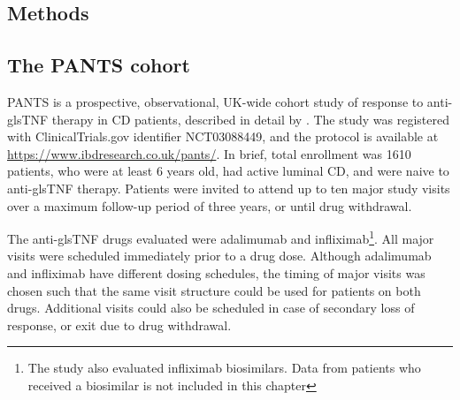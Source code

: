 \begin{outline}
\section{Methods}

\subsection{The PANTS cohort}

\gls{PANTS} is a prospective, observational, UK-wide cohort study of response to anti-gls{TNF} therapy in \gls{CD} patients, described in detail by \textcite{kennedy2019PredictorsAntiTNFTreatment}.
The study was registered with ClinicalTrials.gov identifier NCT03088449, and the protocol is available at \url{https://www.ibdresearch.co.uk/pants/}.
In brief, total enrollment was 1610 patients, who were at least 6 years old, had active luminal \gls{CD}, and were naive to anti-gls{TNF} therapy.
Patients were invited to attend up to ten major study visits over a maximum follow-up period of three years, or until drug withdrawal.

The anti-gls{TNF} drugs evaluated were adalimumab and infliximab\footnote{The study also evaluated infliximab biosimilars. Data from patients who received a biosimilar is not included in this chapter}.
All major visits were scheduled immediately prior to a drug dose.
Although adalimumab and infliximab have different dosing schedules, the timing of major visits was chosen such that the same visit structure could be used for patients on both drugs.
Additional visits could also be scheduled in case of secondary loss of response, or exit due to drug withdrawal.



\end{outline}
